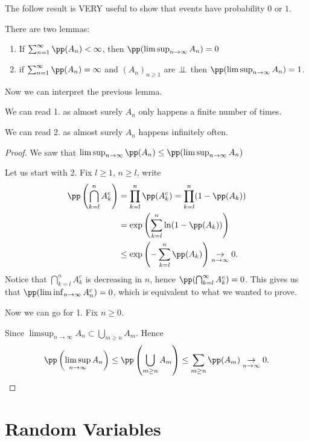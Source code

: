 \documentclass[../main.tex]{subfiles}
\begin{document}
  The follow result is VERY useful to show that events have probability $0$ or $1$.
  \begin{lemma}
    There are two lemmas:
    \begin{enumerate}
      \item If $\sum_{n=1}^{\infty} \pp(A_n) < \infty$, then $\pp(\limsup_{n \to \infty} A_n) =
        0$
      \item if $\sum_{n = 1}^{\infty} \pp(A_n) = \infty$ and $(A_n)_{n \geq 1}$ are $\perp\!\!\!\!\,\perp$ then
      $\pp(\limsup_{n \to \infty} A_n) = 1$.
    \end{enumerate}
  \end{lemma}
  Now we can interpret the previous lemma. 

  We can read 1. as almost surely $A_n$ only
  happens a finite number of times.

  We can read 2. as almost surely $A_n$ happens infinitely often.

  \begin{proof}
    We saw that $\limsup_{n \to \infty}\pp(A_n) \leq \pp(\limsup_{n \to \infty} A_n) $

    Let us start with 2. Fix $l \geq 1$, $n \geq l$, write 
    \begin{align*}
      \pp\left(\bigcap_{k=l}^n A_k^c\right) &=
    \prod_{k=l}^n \pp(A_k^c) = \prod_{k=l}^n (1 - \pp(A_k)) \\
      &= \exp\left(\sum_{k=l}^n \ln(1 - \pp(A_k))\right) \\
      &\leq \exp \left( - \sum_{k = l}^n \pp(A_k) \right) \underset{n \to \infty}{\rightarrow}
      0.
    \end{align*}
    Notice that $\bigcap_{k=l}^n A_k^c$ is decreasing in $n$, hence $\pp(\bigcap_{k=l}^\infty
    A_k^c) = 0$. This gives us that $\pp(\liminf_{n \to \infty} A_n^c) = 0$, which is
    equivalent to what we wanted to prove.

    \vspace{0.3em}

    Now we can go for 1. Fix $n \geq 0$.

    Since $\limsup_{n \to \infty} A_n \subset \bigcup_{m \geq n} A_m$. Hence 
    \[
    \pp \left( \limsup_{n \to \infty} A_n \right) \leq \pp \left( \bigcup_{m \geq n} A_m
    \right) \leq \sum_{m \geq n} \pp(A_m) \underset{n \to \infty}{\rightarrow} 0
    .\] 
  \end{proof}

  \section{Random Variables}
\end{document}
